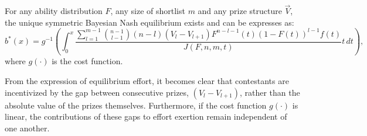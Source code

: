 
\begin{theorem}\label{thm:contestantSBNE}
    For any ability distribution $F$, any size of shortlist $m$ and any prize structure $\vec{V}$, the unique symmetric Bayesian Nash equilibrium exists and can be expresses as:
    \[
        b^*(x) = g^{-1}\left(\int_{0}^{x}\frac{\sum_{l=1}^{m-1}\binom{n-1}{l-1}(n-l)(V_l-V_{l+1})F^{n-l-1}(t)(1-F(t))^{l-1}f(t)}{J(F,n,m,t)} t\, dt \right), 
    \]
    where $g(\cdot)$ is the cost function.
\end{theorem}
\begin{remark}\label{rmk:PrizeGap}
    From the expression of equilibrium effort, it becomes clear that contestants are incentivized by the gap between consecutive prizes, $(V_{l}-V_{l+1})$,  rather than the absolute value of the prizes themselves. Furthermore, if the cost function $g(\cdot)$ is linear, the contributions of these gaps to effort exertion remain independent of one another.
\end{remark}